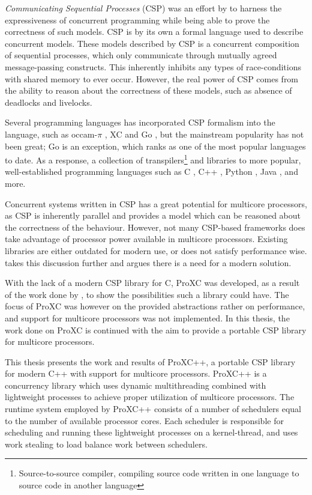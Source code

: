 \textit{Communicating Sequential Processes} (CSP) was an effort by \citet{hoare1978communicating} to harness the expressiveness of concurrent programming while being able to prove the correctness of such models. CSP is by its own a formal language used to describe concurrent models. These models described by CSP is a concurrent composition of sequential processes, which only communicate through mutually agreed message\hyp{}passing constructs. This inherently inhibits any types of race\hyp{}conditions with shared memory to ever occur. However, the real power of CSP comes from the ability to reason about the correctness of these models, such as absence of deadlocks and livelocks.  

Several programming languages has incorporated CSP formalism into the language, such as occam-$\pi$ \citep{barrett1992occam}, XC \citep{douglas2009programming} and Go \citep{go2009go}, but the mainstream popularity has not been great; Go is an exception, which ranks as one of the most popular languages to date. As a response, a collection of transpilers\footnote{Source\hyp{}to\hyp{}source compiler, compiling source code written in one language to source code in another language} and libraries to more popular, well\hyp{}established programming languages such as C \citep{pettersen2016proxc}, C++ \citep{brown2003c++csp,brown2007c++csp2,chalmers2016cppcsp}, Python \citep{bjorndalen2007pycsp}, Java \citep{welch2007jcsp}, and more. 

Concurrent systems written in CSP has a great potential for multicore processors, as CSP is inherently parallel and provides a model which can be reasoned about the correctness of the behaviour. However, not many CSP\hyp{}based frameworks does take advantage of processor power available in multicore processors. Existing libraries are either outdated for modern use, or does not satisfy performance wise.  takes this discussion further and argues there is a need for a modern solution.

With the lack of a modern CSP library for C, ProXC was developed, as a result of the work done by \citet{pettersen2016proxc}, to show the possibilities such a library could have. The focus of ProXC was however on the provided abstractions rather on performance, and support for multicore processors was not implemented. In this thesis, the work done on ProXC is continued with the aim to provide a portable CSP library for multicore processors. 

This thesis presents the work and results of ProXC++, a portable CSP library for modern C++ with support for multicore processors. ProXC++ is a concurrency library which uses dynamic multithreading combined with lightweight processes to achieve proper utilization of multicore processors. The runtime system employed by ProXC++ consists of a number of schedulers equal to the number of available processor cores. Each scheduler is responsible for scheduling and running these lightweight processes on a kernel\hyp{}thread, and uses work stealing to load balance work between schedulers. 



